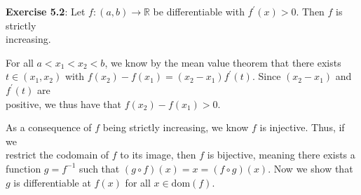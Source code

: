 \documentclass{book}
\newcommand{\pracTwo}{
   \color{Orange}%
   \fontsize{12}{14}\selectfont%
}
\newenvironment{myIndent}{%
   \begin{adjustwidth}{2.5em}{0em}%
}{%
   \end{adjustwidth}%
}
\newcommand{\domain}[1]{\mathrm{dom}(#1)}
\newcommand{\retTwo}{\hfill\bigbreak}
\begin{document}
\textbf{Exercise 5.2}: Let $f: (a, b) \longrightarrow \mathbb{R}$ be differentiable with $f^\prime(x) > 0$. Then $f$ is strictly\\ increasing.

{\begin{myIndent}\pracTwo
   For all $a < x_1 < x_2 < b$, we know by the mean value theorem that there exists\\ $t \in (x_1, x_2)$ with $f(x_2) - f(x_1) = (x_2 - x_1)f^\prime(t)$. Since $(x_2 - x_1)$ and $f^\prime(t)$ are\\ positive, we thus have that $f(x_2) - f(x_1) > 0$.\retTwo
\end{myIndent}}

As a consequence of $f$ being strictly increasing, we know $f$ is injective. Thus, if we\\ restrict the codomain of $f$ to its image, then $f$ is bijective, meaning there exists a\\ function $g = f^{-1}$ such that $(g \circ f)(x) = x = (f \circ g)(x)$. Now we show that\\ $g$ is differentiable at $f(x)$ for all $x \in \domain{f}$.
\end{document}
